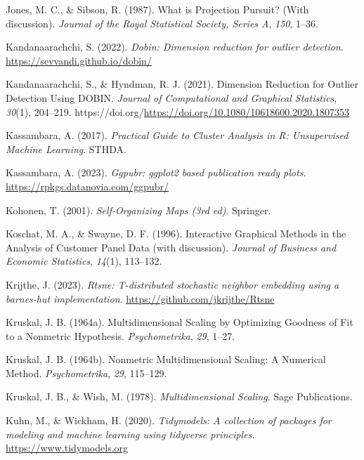 \documentclass[
  letterpaper,
]{krantz}
\newlength{\cslhangindent}
\newenvironment{CSLReferences}[2] %
 {\begin{list}{}{%
  \setlength{\itemindent}{0pt}
  \setlength{\leftmargin}{0pt}
  \setlength{\parsep}{0pt}
  \ifodd #1
   \setlength{\leftmargin}{\cslhangindent}
   \setlength{\itemindent}{-1\cslhangindent}
  \fi
  \setlength{\itemsep}{#2\baselineskip}}}
 {\end{list}}
\begin{document}
\begin{CSLReferences}{1}{0}
Jones, M. C., \& Sibson, R. (1987). {W}hat is {P}rojection {P}ursuit?
(With discussion). \emph{Journal of the Royal Statistical Society,
Series A}, \emph{150}, 1--36.

Kandanaarachchi, S. (2022). \emph{Dobin: Dimension reduction for outlier
detection}. \url{https://sevvandi.github.io/dobin/}

Kandanaarachchi, S., \& Hyndman, R. J. (2021). Dimension {R}eduction for
{O}utlier {D}etection {U}sing DOBIN. \emph{Journal of Computational and
Graphical Statistics}, \emph{30}(1), 204--219.
https://doi.org/\url{https://doi.org/10.1080/10618600.2020.1807353}

Kassambara, A. (2017). \emph{Practical {G}uide to {C}luster {A}nalysis
in {R}: {U}nsupervised {M}achine {L}earning}. STHDA.

Kassambara, A. (2023). \emph{Ggpubr: ggplot2 based publication ready
plots}. \url{https://rpkgs.datanovia.com/ggpubr/}

Kohonen, T. (2001). \emph{Self-{O}rganizing {M}aps (3rd ed)}. Springer.

Koschat, M. A., \& Swayne, D. F. (1996). Interactive {G}raphical
{M}ethods in the {A}nalysis of {C}ustomer {P}anel {D}ata (with
discussion). \emph{Journal of Business and Economic Statistics},
\emph{14}(1), 113--132.

Krijthe, J. (2023). \emph{Rtsne: T-distributed stochastic neighbor
embedding using a barnes-hut implementation}.
\url{https://github.com/jkrijthe/Rtsne}

Kruskal, J. B. (1964a). Multidimensional {S}caling by {O}ptimizing
{G}oodness of {F}it to a {N}onmetric {H}ypothesis. \emph{Psychometrika},
\emph{29}, 1--27.

Kruskal, J. B. (1964b). Nonmetric {M}ultidimensional {S}caling: A
{N}umerical {M}ethod. \emph{Psychometrika}, \emph{29}, 115--129.

Kruskal, J. B., \& Wish, M. (1978). \emph{Multidimensional {S}caling}.
Sage Publications.

Kuhn, M., \& Wickham, H. (2020). \emph{Tidymodels: A collection of
packages for modeling and machine learning using tidyverse principles.}
\url{https://www.tidymodels.org}


\end{CSLReferences}
\end{document}
